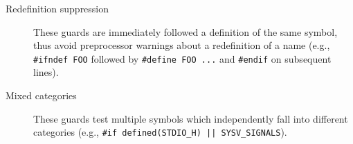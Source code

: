 \begin{description}
\item[Redefinition suppression] These guards are immediately
      followed a definition of the same symbol, thus avoid preprocessor
      warnings about a redefinition of a name (e.g., \texttt{#ifndef
      FOO} followed by \texttt{#define FOO ...} and \texttt{#endif} on
      subsequent lines).

\item[Mixed categories] These guards test multiple symbols
      which independently fall into different categories (e.g.,
      \texttt{#if defined(STDIO_H) || SYSV_SIGNALS}).

\end{description}

